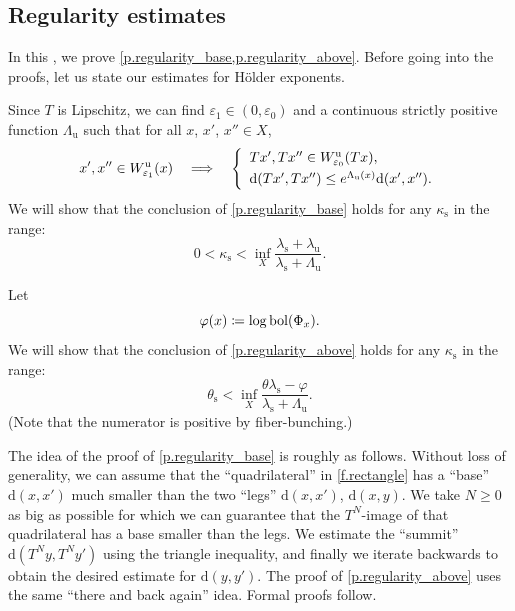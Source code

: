 \documentclass[10pt]{amsart}
\def\vcentcolon{\mathrel{\mathop\ordinarycolon}}
\providecommand\ordinarycolon{:}
\providecommand*\coloneqq{\vcentcolon\mathrel{\mkern-1.2mu}=}
\newcommand\implique{\mathchoice{\Longrightarrow}{\Rightarrow}{\Rightarrow}{\Rightarrow}}
\theoremstyle{plain}
\theoremstyle{definition}
\newcommand{\dd}{\mathrm{d}}
\newcommand{\uu}{\mathrm{u}}
\renewcommand{\ss}{\mathrm{s}}
\DeclareMathOperator{\bol}{bol}
\let\epsilon\varepsilon
\let\phi\varphi
\begin{document}
\subsection{Regularity estimates}\label{ss.regularity}

In this , we prove \cref{p.regularity_base,p.regularity_above}.
Before going into the proofs, let us state our estimates for Hölder exponents.

Since $T$ is Lipschitz, we can find $\epsilon_1 \in (0,\epsilon_0)$ and a continuous strictly positive function $\Lambda_\uu$ such that for all $x$, $x'$, $x''\in X$,
\begin{equation}\label{e.Lambda_u}
x',x''\in W^\uu_{\epsilon_1}(x) \quad \implique \quad
\left\{
\begin{array}{l}
	Tx', Tx'' \in W^\uu_{\epsilon_0}(Tx), \\[3pt]
	\dd(Tx', Tx'') \le e^{\Lambda_\uu(x)} \dd(x', x'').
\end{array}
\right.
\end{equation}
We will show that the conclusion of \cref{p.regularity_base} holds for any $\kappa_\ss$ in the range:
\begin{equation}\label{e.regularity_estimate_base}
0 < \kappa_{\ss} < \inf_{X} \frac{\lambda_\ss+\lambda_\uu}{\lambda_\ss+\Lambda_\uu}.
\end{equation}

Let
\begin{equation}\label{e.def_phi}
\phi(x) \coloneqq \log \bol(\Phi_x).
\end{equation}
We will show that the conclusion of \cref{p.regularity_above} holds for any $\kappa_\ss$ in the range:
\begin{equation}\label{e.regularity_estimate_above}
\theta_{\ss} < \inf_{X} \frac{\theta \lambda_\ss - \phi}{\lambda_\ss+\Lambda_\uu}.
\end{equation}
(Note that the numerator is positive by fiber-bunching.)

The idea of the proof of \cref{p.regularity_base} is roughly as follows.
Without loss of generality, we can assume that the ``quadrilateral'' in \cref{f.rectangle} has a ``base'' $\dd(x,x')$ much smaller than the two ``legs'' $\dd(x,x')$, $\dd(x,y)$.
We take $N \ge 0$ as big as possible for which we can guarantee that the $T^N$-image of that quadrilateral has a base smaller than the legs.
We estimate the ``summit'' $\dd(T^N y, T^N y')$ using the triangle inequality, and finally we iterate backwards to obtain the desired estimate for $\dd(y, y')$.
The proof of \cref{p.regularity_above} uses the same ``there and back again'' idea.
Formal proofs follow.
\end{document}
